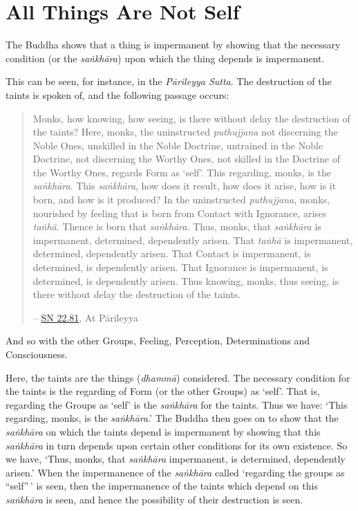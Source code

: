 \chapter{All Things Are Not Self}

The Buddha shows that a thing is impermanent by showing that the necessary condition (or the \textit{saṅkhāra}) upon which the thing depends is impermanent.

This can be seen, for instance, in the \textit{Pārileyya Sutta}. The destruction of the taints is spoken of, and the following passage occurs:

\begin{quote}
Monks, how knowing, how seeing, is there without delay the destruction of the taints? Here, monks, the uninstructed \textit{puthujjana} not discerning the Noble Ones, unskilled in the Noble Doctrine, untrained in the Noble Doctrine, not discerning the Worthy Ones, not skilled in the Doctrine of the Worthy Ones, regards Form as `self'. This regarding, monks, is the \textit{saṅkhāra}. This \textit{saṅkhāra}, how does it result, how does it arise, how is it born, and how is it produced? In the uninstructed \textit{puthujjana}, monks, nourished by feeling that is born from Contact with Ignorance, arises \textit{taṅhā}. Thence is born that \textit{saṅkhāra}. Thus, monks, that \textit{saṅkhāra} is impermanent, determined, dependently arisen. That \textit{taṅhā} is impermanent, determined, dependently arisen. That Contact is impermanent, is determined, is dependently arisen. That Ignorance is impermanent, is determined, is dependently arisen. Thus knowing, monks, thus seeing, is there without delay the destruction of the taints.

 -- \href{https://suttacentral.net/sn22.81/en/bodhi}{SN 22.81}, At Pārileyya
\end{quote}

And so with the other Groups, Feeling, Perception, Determinations and Consciousness.

Here, the taints are the things (\textit{dhammā}) considered. The necessary condition for the taints is the regarding of Form (or the other Groups) as `self'. That is, regarding the Groups as `self' is the \textit{saṅkhāra} for the taints. Thus we have: `This regarding, monks, is the \textit{saṅkhāra}.' The Buddha then goes on to show that the \textit{saṅkhāra} on which the taints depend is impermanent by showing that this \textit{saṅkhāra} in turn depends upon certain other conditions for its own existence. So we have, `Thus, monks, that \textit{saṅkhāra} impermanent, is determined, dependently arisen.' When the impermanence of the \textit{saṅkhāra} called `regarding the groups as ``self''\,' is seen, then the impermanence of the taints which depend on this \textit{saṅkhāra} is seen, and hence the possibility of their destruction is seen.


